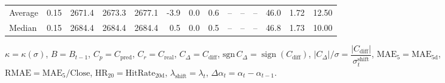 \begin{threeparttable}
{\begin{tabular}{lrrrrrrrrrrrrr}
Average &     0.15 & 2671.4 & 2673.3 & 2677.1 &       -3.9 &                      0.0 &                 0.6 &         -- &        -- &             -- &             46.0 &            1.72 &                  12.50 \\
 Median &     0.15 & 2684.4 & 2684.4 & 2684.4 &        0.5 &                      0.0 &                 0.5 &         -- &        -- &             -- &             46.8 &            1.73 &                  10.00 \\
\bottomrule
\end{tabular}
}
\begin{tablenotes}\footnotesize
\item $\kappa=\kappa(\sigma)$, $B=B_{t-1}$, $C_p=C_{\text{pred}}$, $C_r=C_{\text{real}}$, $C_\Delta=C_{\text{diff}}$, $\mathrm{sgn}\,C_\Delta=\operatorname{sign}(C_{\text{diff}})$, $|C_\Delta|/\sigma=\dfrac{|C_{\text{diff}}|}{\sigma_t^{\text{shift}}}$, $\mathrm{MAE}_5=\mathrm{MAE}_{5\text{d}}$, $\mathrm{RMAE}= \mathrm{MAE}_5 / \text{Close}$, $\mathrm{HR}_{20}=\mathrm{HitRate}_{20\text{d}}$, 
$\lambda_{\text{shift}}=\lambda_t$, 
$\Delta\alpha_t=\alpha_t-\alpha_{t-1}$.
\end{tablenotes}
\end{threeparttable}
\endgroup

